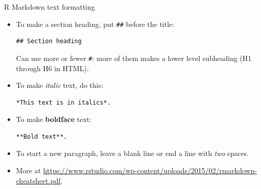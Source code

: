 \documentclass[unknownkeysallowed]{beamer}\usepackage[]{graphicx}\usepackage[]{color}
\begin{document}
\begin{frame}[fragile]{R Markdown text formatting}
  
  \begin{itemize}
  \item To make a section heading, put \texttt{\#\#} before the title:
    
\begin{verbatim}
## Section heading
\end{verbatim}
    Can use more or fewer \texttt{\#}: more of them makes a lower level
    subheading (H1 through H6 in HTML).  
  \item To make \emph{italic} text, do this:
    
\begin{verbatim}
*This text is in italics*.
\end{verbatim}
    
    \item To make \textbf{boldface} text:
      
\begin{verbatim}
**Bold text**.
\end{verbatim}
      
      \item To start a new paragraph, leave a blank line or end a line
        with \emph{two} spaces.
        \item More at \url{https://www.rstudio.com/wp-content/uploads/2015/02/rmarkdown-cheatsheet.pdf}.
  \end{itemize}
  
  
  
\end{frame}
\end{document}
